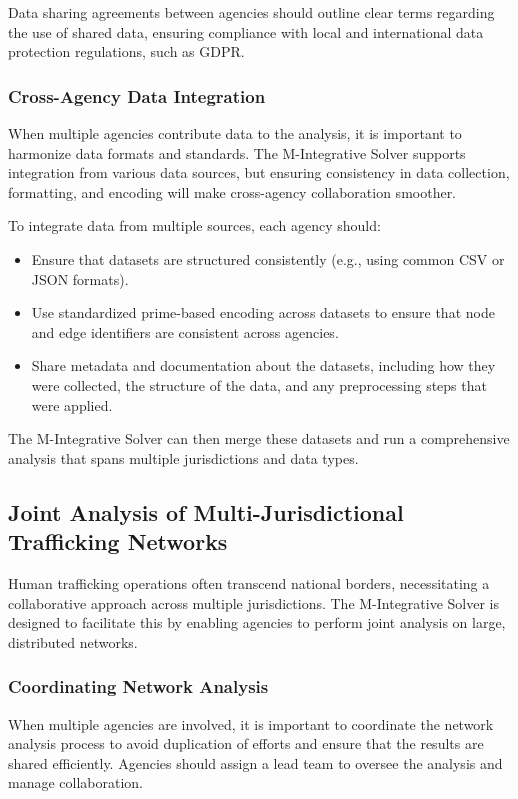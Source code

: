 \documentclass[%
 preprint, linenumbers,
 amsmath,amssymb,
 aps, physrev,
]{revtex4-2}
\begin{document}
Data sharing agreements between agencies should outline clear terms regarding the use of shared data, ensuring compliance with local and international data protection regulations, such as GDPR.

\subsubsection{Cross-Agency Data Integration}

When multiple agencies contribute data to the analysis, it is important to harmonize data formats and standards. The M-Integrative Solver supports integration from various data sources, but ensuring consistency in data collection, formatting, and encoding will make cross-agency collaboration smoother.

To integrate data from multiple sources, each agency should:
\begin{itemize}
    \item Ensure that datasets are structured consistently (e.g., using common CSV or JSON formats).
    \item Use standardized prime-based encoding across datasets to ensure that node and edge identifiers are consistent across agencies.
    \item Share metadata and documentation about the datasets, including how they were collected, the structure of the data, and any preprocessing steps that were applied.
\end{itemize}

The M-Integrative Solver can then merge these datasets and run a comprehensive analysis that spans multiple jurisdictions and data types.

\subsection{Joint Analysis of Multi-Jurisdictional Trafficking Networks}

Human trafficking operations often transcend national borders, necessitating a collaborative approach across multiple jurisdictions. The M-Integrative Solver is designed to facilitate this by enabling agencies to perform joint analysis on large, distributed networks.

\subsubsection{Coordinating Network Analysis}

When multiple agencies are involved, it is important to coordinate the network analysis process to avoid duplication of efforts and ensure that the results are shared efficiently. Agencies should assign a lead team to oversee the analysis and manage collaboration. 
\end{document}
